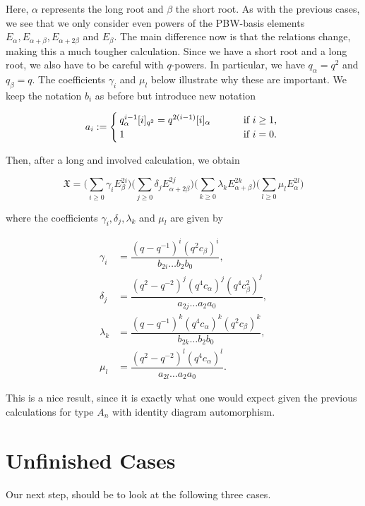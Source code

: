 \documentclass[a4 paper, 10pt]{article}
\theoremstyle{definition}
\theoremstyle{remark}
\numberwithin{equation}{section}
\begin{document}
Here, $\alpha$ represents the long root and $\beta$ the short root. As with the previous cases, we see that we only consider even powers of the PBW-basis elements $E_{\alpha}, E_{\alpha + \beta}, E_{\alpha + 2\beta}$ and $E_{\beta}$. The main difference now is that the relations change, making this a much tougher calculation. Since we have a short root and a long root, we also have to be careful with $q$-powers. In particular, we have $q_{\alpha} = q^2$ and $q_{\beta} = q$. The coefficients $\gamma_i$ and $\mu_l$ below illustrate why these are important. We keep the notation $b_i$ as before but introduce new notation

\begin{equation*}
	a_i := 	\begin{cases}
				q_\alpha^{i-1}[i]_{q^2} = q^{2(i-1)}[i]_{\alpha} \qquad &\mbox{ if $i \geq 1$, }\\
				1 \qquad &\mbox{ if $ i = 0$.}
			\end{cases}
\end{equation*}

Then, after a long and involved calculation, we obtain

\begin{equation} \label{B2}
	\mathfrak{X} = \Big( \sum_{i \geq 0} \gamma_i E_{\beta}^{2i} \Big) \Big( \sum_{j \geq 0} \delta_j E_{\alpha + 2\beta}^{2j} \Big) \Big( \sum_{k \geq 0} \lambda_k E_{\alpha + \beta}^{2k} \Big) \Big( 							\sum_{l \geq 0} \mu_l E_{\alpha}^{2l} \Big)
\end{equation}

where the coefficients $\gamma_i, \delta_j, \lambda_k$ and $\mu_l$ are given by

\begin{align*}
	\gamma_i &= \dfrac{ ( q - q^{-1} )^i ( q^2 c_{\beta} )^i }{ b_{2i} \dots b_2 b_0 },\\ 		
	\delta_j &= \dfrac{ (q^2 - q^{-2})^j ( q^4 c_{\alpha} )^j ( q^4 c_{\beta}^2 )^j }{ a_{2j} \dots a_2 a_0 },\\
	\lambda_k &= \dfrac{( q - q^{-1} )^k ( q^4 c_{\alpha} )^k ( q^2 c_{\beta} )^k }{ b_{2k} \dots b_2 b_0 },\\		
	\mu_l &= \dfrac{ ( q^2 - q^{-2} )^l ( q^4 c_{\alpha} )^l }{ a_{2l} \dots a_2 a_0 }.
\end{align*}

This is a nice result, since it is exactly what one would expect given the previous calculations for type $A_n$ with identity diagram automorphism.
\section{Unfinished Cases}
Our next step, should be to look at the following three cases.
\end{document}
